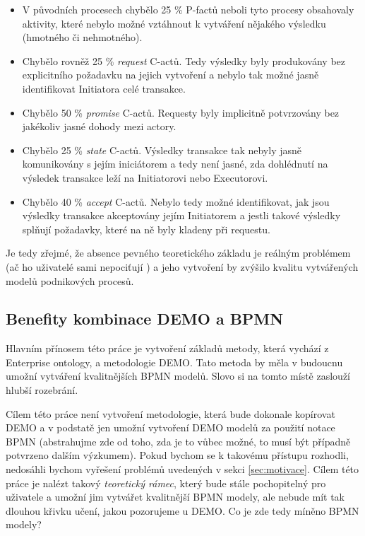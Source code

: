 \begin{itemize}
\item V původních procesech chybělo 25 \% P-factů neboli tyto procesy obsahovaly aktivity, které nebylo možné vztáhnout k vytváření nějakého výsledku (hmotného či nehmotného).
\item Chybělo rovněž 25 \% \textit{request} C-actů. Tedy výsledky byly produkovány bez explicitního požadavku na jejich vytvoření a nebylo tak možné jasně identifikovat Initiatora celé transakce.
\item Chybělo 50 \% \textit{promise} C-actů. Requesty byly implicitně potvrzovány bez jakékoliv jasné dohody mezi actory.
\item Chybělo 25 \% \textit{state} C-actů. Výsledky transakce tak nebyly jasně komunikovány s jejím iniciátorem a tedy není jasné, zda dohlédnutí na výsledek transakce leží na Initiatorovi nebo Executorovi.
\item Chybělo 40 \% \textit{accept} C-actů. Nebylo tedy možné identifikovat, jak jsou výsledky transakce akceptovány jejím Initiatorem a jestli takové výsledky splňují požadavky, které na ně byly kladeny při requestu.
\end{itemize}

Je tedy zřejmé, že absence pevného teoretického základu je reálným problémem (ač ho uživatelé sami nepociťují \cite{VanNuffel2009}) a jeho vytvoření by zvýšilo kvalitu vytvářených modelů podnikových procesů.

\subsection{Benefity kombinace DEMO a BPMN} \label{sec:demo_bpmn_benefity}
Hlavním přínosem této práce je vytvoření základů metody, která vychází z Enterprise ontology, \ptheory{} a metodologie DEMO. Tato metoda by měla v budoucnu umožní vytváření kvalitnějších BPMN modelů. Slovo  si na tomto místě zaslouží hlubší rozebrání.

Cílem této práce není vytvoření metodologie, která bude dokonale kopírovat DEMO a v podstatě jen umožní vytvoření DEMO modelů za použití notace BPMN (abstrahujme zde od toho, zda je to vůbec možné, to musí být případně potvrzeno dalším výzkumem). Pokud bychom se k takovému přístupu rozhodli, nedosáhli bychom vyřešení problémů uvedených v sekci \ref{sec:motivace}. Cílem této práce je nalézt takový \textit{teoretický rámec}, který bude stále pochopitelný pro uživatele a umožní jim vytvářet kvalitnější BPMN modely, ale nebude mít tak dlouhou křivku učení, jakou pozorujeme u DEMO. Co je zde tedy míněno  BPMN modely?

